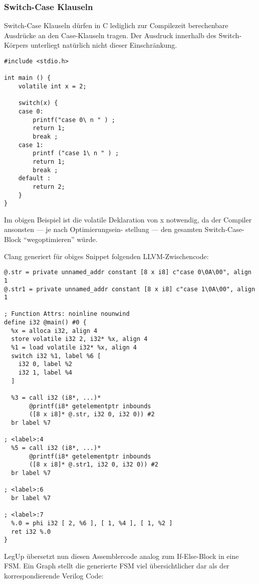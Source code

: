 \documentclass[oneside,a4paper]{article}
\begin{document}
\subsubsection{Switch-Case Klauseln}
Switch-Case Klauseln dürfen in C lediglich zur Compilezeit
berechenbare Ausdrücke an den Case-Klauseln tragen. Der
Ausdruck innerhalb des Switch-Körpers unterliegt
natürlich nicht dieser Einschränkung.

\begin{lstlisting}[style=verilog]
#include <stdio.h>

int main () {
    volatile int x = 2;

    switch(x) {
    case 0:
        printf("case 0\ n " ) ;
        return 1;
        break ;
    case 1:
        printf ("case 1\ n " ) ;
        return 1;
        break ;
    default :
        return 2;
    }
}
\end{lstlisting}

Im obigen Beispiel ist die volatile Deklaration von x notwendig,
da der Compiler ansonsten --- je nach Optimierungsein-
stellung --- den gesamten Switch-Case-Block “wegoptimieren” würde.

Clang generiert für obiges Snippet folgenden LLVM-Zwischencode:

\begin{lstlisting}[style=asm]
@.str = private unnamed_addr constant [8 x i8] c"case 0\0A\00", align 1
@.str1 = private unnamed_addr constant [8 x i8] c"case 1\0A\00", align 1

; Function Attrs: noinline nounwind
define i32 @main() #0 {
  %x = alloca i32, align 4
  store volatile i32 2, i32* %x, align 4
  %1 = load volatile i32* %x, align 4
  switch i32 %1, label %6 [
    i32 0, label %2
    i32 1, label %4
  ]

  %3 = call i32 (i8*, ...)*
       @printf(i8* getelementptr inbounds
       ([8 x i8]* @.str, i32 0, i32 0)) #2
  br label %7

; <label>:4
  %5 = call i32 (i8*, ...)*
       @printf(i8* getelementptr inbounds
       ([8 x i8]* @.str1, i32 0, i32 0)) #2
  br label %7

; <label>:6
  br label %7

; <label>:7
  %.0 = phi i32 [ 2, %6 ], [ 1, %4 ], [ 1, %2 ]
  ret i32 %.0
}
\end{lstlisting}

LegUp übersetzt nun diesen Assemblercode analog zum
If-Else-Block in eine FSM. Ein Graph stellt die generierte FSM
viel übersichtlicher dar als der korrespondierende Verilog Code:
\end{document}
